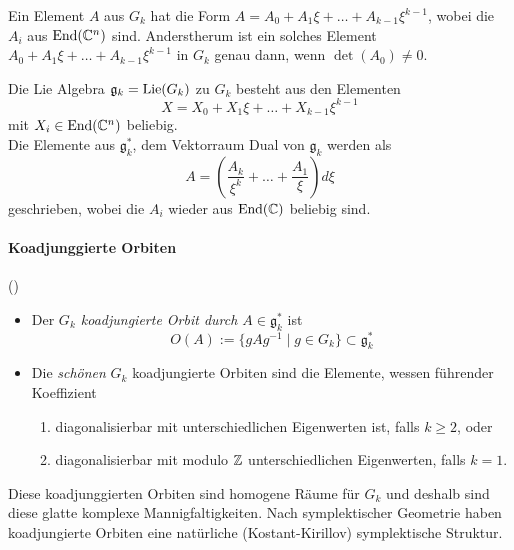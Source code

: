 Ein Element $A$ aus $G_k$ hat die Form $A=A_0+A_1\xi+\dots+A_{k-1}\xi^{k-1}$,
wobei die $A_i$ aus $\operatorname{End}(\mathbb{C}^n)$ sind. Anderstherum ist ein solches Element
$A_0+A_1\xi+\dots+A_{k-1}\xi^{k-1}$ in $G_k$ genau dann, wenn $\det(A_0)\neq0$.
\begin{comment}
Zu Zeigen: $\det(\sum^{k-1}_{i=0}A_{i}\xi^{i})\neq 0$ $\Leftrightarrow$
$\det(A_0)\neq0$.\\
\textbf{Denn} $\det(\sum^{k-1}_{i=0}A_{i}\xi^{i})=\overset{\text{\color{red}?}}\dots
=\det(A_0)$.
\end{comment}
Die Lie Algebra $\mathfrak g_k=\operatorname{Lie}(G_k)$ zu $G_k$ besteht aus den Elementen
\[
X=X_0+X_1\xi+\dots+X_{k-1}\xi^{k-1}
\]
mit $X_i\in\operatorname{End}(\mathbb{C}^n)$ beliebig.\\
Die Elemente aus $\mathfrak g_k^*$, dem Vektorraum Dual von $\mathfrak g_k$
werden als
\[
A=\left(\frac{A_{k}}{\xi^{k}}+\dots+\frac{A_{1}}{\xi}\right)d\xi
\]
geschrieben, wobei die $A_i$ wieder aus $\operatorname{End}(\mathbb{C})$ beliebig sind. 
\begin{comment}
\ccite[p. 22]{thboalch}
Die Paarung zwischen $\mathfrak g_k^*$ und $\mathfrak g_k$ ist gegeben durch
\[
<A,X>=\Res_0(\Tr(AX))=\sum^{k}_{i=1}\Tr(A_iX_{i-1})
\]
Wobei $\Res_0$ die Residuen Abbildung ist, welche den Koeffizient vor
$d\xi/\xi$ ausgibt.
\textbf{Observe that the product $AX$ is a well defined element of $\mathfrak
g_k^∗$, where $A\in\mathfrak g_k^*$ and $X\in\mathfrak g_k$.}
Ähnlich ist das Produkt $XA$ wohldefiniert in $\mathfrak g_k^∗$. Damit ist
$\mathfrak g_k^*$ ein Bimodul über $\mathfrak g_k$.
\end{comment}

\paragraph{Koadjunggierte Orbiten} (\cite[pp.23-26]{thboalch})
\begin{defn}
\begin{itemize}
\item
Der \emph{$G_k$ koadjungierte Orbit durch $A\in\mathfrak g_k^*$} ist
\[
O(A):=\{gAg^{-1}\mid g\in G_k\}\subset\mathfrak g_k^*
\]
\item
Die \emph{schönen} $G_k$ koadjungierte Orbiten sind die Elemente, wessen
führender Koeffizient
\begin{enumerate}
\item
diagonalisierbar mit unterschiedlichen Eigenwerten ist, falls $k\geq2$, oder
\item
diagonalisierbar mit modulo $\mathbb{Z}$ unterschiedlichen Eigenwerten, falls $k=1$.
\end{enumerate}
\end{itemize}
\end{defn}
Diese koadjunggierten Orbiten sind homogene Räume für $G_k$ und deshalb sind
diese glatte komplexe Mannigfaltigkeiten.
Nach symplektischer Geometrie haben koadjungierte Orbiten eine natürliche
(Kostant-Kirillov) symplektische Struktur.

